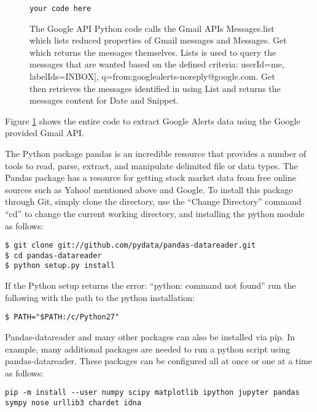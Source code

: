 \documentclass[sigconf]{acmart}
\begin{document}
\begin{figure}[htb]
\begin{verbatim}
your code here 
\end{verbatim}
\caption{The Google API Python code calls the Gmail APIs Messages.list which lists reduced properties of Gmail messages and Messages. Get which returns the messages themselves. Lists is used to query the messages that are wanted based on the defined criteria: userId=me, labelIds=INBOX], q=from:googlealerts-noreply@google.com. Get then retrieves the messages identified in using List and returns the messages content for Date and Snippet.}\label{c:googleapi}
\end{figure}

Figure \ref{c:googleapi} shows the entire code to extract Google Alerts data using the Google provided Gmail API.


The Python package pandas is an incredible resource that provides a number of tools to read, parse, extract, and manipulate delimited file or data types. The Pandas package has a resource for getting stock market data from free online sources such as Yahoo! mentioned above and Google. To install this package through Git, simply clone the directory, use the ``Change Directory'' command ``cd'' to change the current working directory, and installing the python module as follows: 

\begin{mdframed}[style=default]
\begin{lstlisting}
$ git clone git://github.com/pydata/pandas-datareader.git
$ cd pandas-datareader
$ python setup.py install
\end{lstlisting}
\end{mdframed}

If the Python setup returns the error: ``python: command not found'' run the following with the path to the python installation:
\begin{mdframed}[style=default]
\begin{lstlisting}
$ PATH="$PATH:/c/Python27"
\end{lstlisting}
\end{mdframed}

Pandas-datareader and many other packages can also be installed via pip. In example, many additional packages are needed to run a python script using pandas-datareader. These packages can be configured all at once or one at a time as follows:
\begin{mdframed}[style=default]
\begin{lstlisting}
pip -m install --user numpy scipy matplotlib ipython jupyter pandas sympy nose urllib3 chardet idna
\end{lstlisting}
\end{mdframed}
\end{document}

